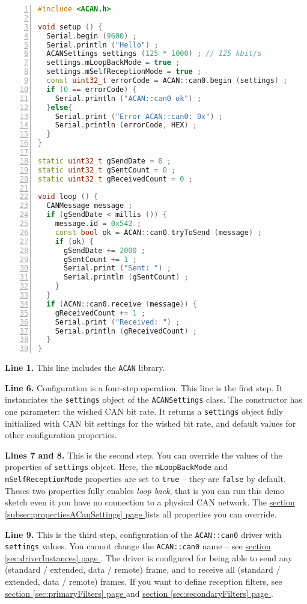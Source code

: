 \documentclass[10pt, a4paper, obeyspaces, openany]{extarticle}
\newcommand\refSectionPage[1]{\hyperref[sec:#1]{section \ref*{sec:#1} page \pageref{sec:#1}}}
\newcommand\refSubsectionPage[1]{\hyperref[subsec:#1]{section \ref*{subsec:#1} page \pageref{subsec:#1}}}
\begin{document}
{ \small\begin{lstlisting}[language=c++,numbers=left]
#include <ACAN.h>

void setup () {
  Serial.begin (9600) ;
  Serial.println ("Hello") ;
  ACANSettings settings (125 * 1000) ; // 125 kbit/s
  settings.mLoopBackMode = true ;
  settings.mSelfReceptionMode = true ;
  const uint32_t errorCode = ACAN::can0.begin (settings) ;
  if (0 == errorCode) {
    Serial.println ("ACAN::can0 ok") ;
  }else{
    Serial.print ("Error ACAN::can0: 0x") ;
    Serial.println (errorCode, HEX) ;
  }
}

static uint32_t gSendDate = 0 ;
static uint32_t gSentCount = 0 ;
static uint32_t gReceivedCount = 0 ;

void loop () {
  CANMessage message ;
  if (gSendDate < millis ()) {
    message.id = 0x542 ;
    const bool ok = ACAN::can0.tryToSend (message) ;
    if (ok) {
      gSendDate += 2000 ;
      gSentCount += 1 ;
      Serial.print ("Sent: ") ;
      Serial.println (gSentCount) ;
    }
  }
  if (ACAN::can0.receive (message)) {
    gReceivedCount += 1 ;
    Serial.print ("Received: ") ;
    Serial.println (gReceivedCount) ;
  }
}
\end{lstlisting}}

{\bf Line 1.} This line includes the \texttt{ACAN} library.

{\bf Line 6.} Configuration is a four-step operation. This line is the first step. It instanciates the \texttt{settings} object of the \texttt{ACANSettings} class. The constructor has one parameter: the wished CAN bit rate. It returns a \texttt{settings} object fully initialized with CAN bit settings for the wished bit rate, and default values for other configuration properties.

{\bf Lines 7 and 8.} This is the second step. You can override the values of the properties of \texttt{settings} object. Here, the \texttt{mLoopBackMode} and \texttt{mSelfReceptionMode} properties are set to \texttt{true} -- they are \texttt{false} by default. Theses two properties fully enables \emph{loop back}, that is you can run this demo sketch even it you have no connection to a physical CAN network. The \refSubsectionPage{propertiesACanSettings} lists all properties you can override.

{\bf Line 9.} This is the third step, configuration of the \texttt{ACAN::can0} driver with \texttt{settings} values. You cannot change the \texttt{ACAN::can0} name -- see \refSectionPage{driverInstances}. The driver is configured for being able to send any (standard / extended, data / remote) frame, and to receive all (standard / extended, data / remote) frames. If you want to define reception filters, see \refSectionPage{primaryFilters} and  \refSectionPage{secondaryFilters}.
\end{document}
